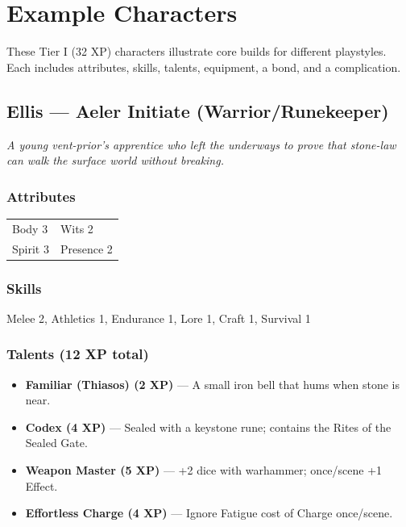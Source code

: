 
\section{Example Characters}

These Tier I (32 XP) characters illustrate core builds for different playstyles. Each includes attributes, skills, talents, equipment, a bond, and a complication.

\subsection{Ellis --- Aeler Initiate (Warrior/Runekeeper)}

\textit{A young vent-prior's apprentice who left the underways to prove that stone-law can walk the surface world without breaking.}

\subsubsection*{Attributes}
\begin{tabular}{@{}ll@{}}
Body 3 & Wits 2 \\
Spirit 3 & Presence 2 \\
\end{tabular}

\subsubsection*{Skills}
Melee 2, Athletics 1, Endurance 1, Lore 1, Craft 1, Survival 1

\subsubsection*{Talents (12 XP total)}
\begin{itemize}
  \item \textbf{Familiar (Thiasos) (2 XP)} --- A small iron bell that hums when stone is near.
  \item \textbf{Codex (4 XP)} --- Sealed with a keystone rune; contains the Rites of the Sealed Gate.
  \item \textbf{Weapon Master (5 XP)} --- +2 dice with warhammer; once/scene +1 Effect.
  \item \textbf{Effortless Charge (4 XP)} --- Ignore Fatigue cost of Charge once/scene.
\end{itemize}

